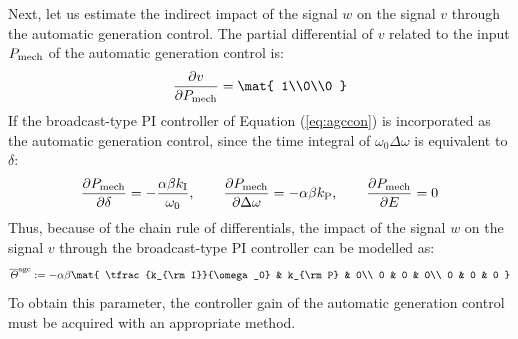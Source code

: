 \documentclass[tombow,dvipdfmx]{corona-a5-1.1}
\begin{document}
Next, let us estimate the indirect impact of the signal $w$ on the signal $v$ through the automatic generation control.  The partial differential of $v$ related to the input $P_{\rm mech}$ of the automatic generation control is:
\[
\frac{\partial v}{\partial P_{\rm mech}}
=
\mat{
1\\0\\0
}
\]
If the broadcast-type PI controller of Equation (\ref{eq:agccon}) is incorporated as the automatic generation control, since the time integral of $\omega_0 \Delta \omega$ is equivalent to $\delta$:
\[
\frac{\partial P_{\rm mech}}{\partial \delta} = -  \frac{\alpha \beta k_{\rm I}}{\omega_0} 
,\qquad
\frac{\partial P_{\rm mech}}{\partial \Delta \omega}= - \alpha \beta k_{\rm P}
,\qquad
\frac{\partial P_{\rm mech}}{\partial E}= 0
\]
Thus, because of the chain rule of differentials, the impact of the signal $w$ on the signal $v$ through the broadcast-type PI controller can be modelled as:
\begin{align}
\overline{\mathit{\Theta}}^{\rm agc}:=
-  \alpha \beta \mat{
\tfrac{k_{\rm I}}{\omega_0} & k_{\rm P}  & 0\\
0 & 0 & 0\\
0 & 0 & 0
}
\end{align}
To obtain this parameter, the controller gain of the automatic generation control must be acquired with an appropriate method.
\end{document}
